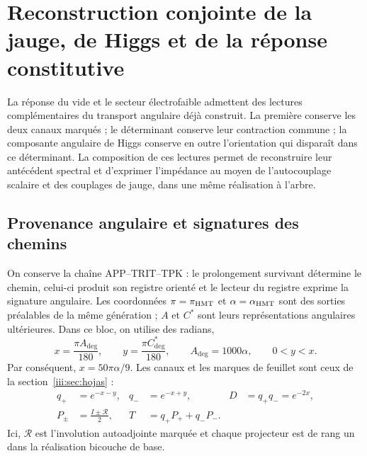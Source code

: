 \section{Reconstruction conjointe de la jauge, de Higgs et de la réponse constitutive}
\label{amp-higgs-seccion}

La réponse du vide et le secteur électrofaible admettent des lectures complémentaires
du transport angulaire déjà construit. La première conserve les deux canaux
marqués ; le déterminant conserve leur contraction commune ; la composante angulaire
de Higgs conserve en outre l’orientation qui disparaît dans ce déterminant.
La composition de ces lectures permet de reconstruire leur antécédent spectral
et d’exprimer l’impédance au moyen de l’autocouplage scalaire et des couplages
de jauge, dans une même réalisation à l’arbre.

\subsection{Provenance angulaire et signatures des chemins}

On conserve la chaîne APP--TRIT--TPK : le prolongement survivant détermine
le chemin, celui-ci produit son registre orienté et le lecteur du registre exprime
la signature angulaire. Les coordonnées $\pi=\pi_{\rm HMT}$ et
$\alpha=\alpha_{\rm HMT}$ sont des sorties préalables de la même génération ;
$A$ et $C^*$ sont leurs représentations angulaires ultérieures. Dans ce bloc, on
utilise des radians,
\begin{equation}
 x=\frac{\pi A_{\deg}}{180},\qquad
 y=\frac{\pi C^*_{\deg}}{180},\qquad
 A_{\deg}=1000\alpha,\qquad 0<y<x.
 \label{amp-higgs-angulos}
\end{equation}
Par conséquent, $x=50\pi\alpha/9$. Les canaux et les marques de feuillet sont ceux
de la section~\ref{iii:sec:hojas} :
\begin{equation}
 \begin{aligned}
 q_+&=e^{-x-y},& q_-&=e^{-x+y},& D&=q_+q_-=e^{-2x},\\
 P_\pm&=\frac{I\pm\mathcal R}{2},&
 T&=q_+P_++q_-P_-.
 \end{aligned}
 \label{amp-higgs-transporte}
\end{equation}
Ici, $\mathcal R$ est l’involution autoadjointe marquée et chaque projecteur
est de rang un dans la réalisation bicouche de base.

